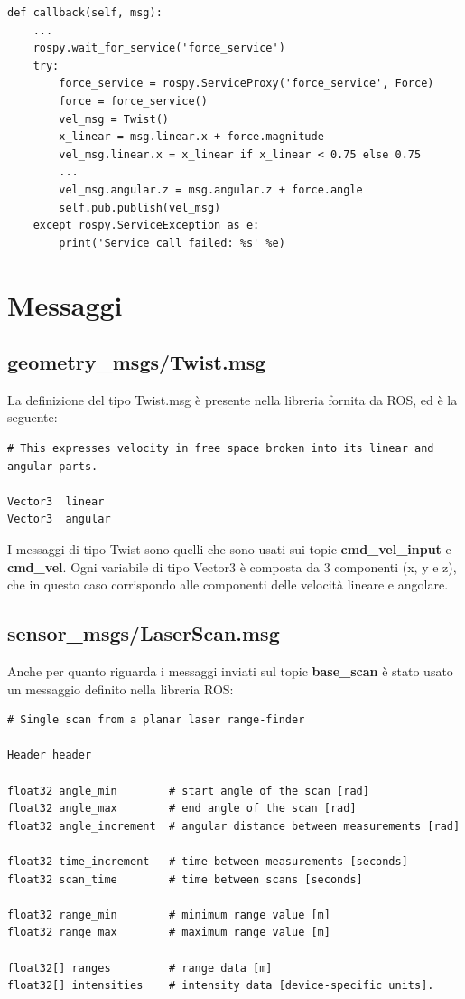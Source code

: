 \documentclass[Lau, binding=0.6cm, oneside]{sapthesis}
\begin{document}
\begin{lstlisting}
def callback(self, msg):
    ...
    rospy.wait_for_service('force_service')
    try:
        force_service = rospy.ServiceProxy('force_service', Force)
        force = force_service()
        vel_msg = Twist()
        x_linear = msg.linear.x + force.magnitude
        vel_msg.linear.x = x_linear if x_linear < 0.75 else 0.75
        ...
        vel_msg.angular.z = msg.angular.z + force.angle
        self.pub.publish(vel_msg)
    except rospy.ServiceException as e:
        print('Service call failed: %s' %e)
\end{lstlisting}

\section{Messaggi}
\subsection{geometry\_msgs/Twist.msg}
La definizione del tipo Twist.msg è presente nella libreria fornita da ROS, ed è la seguente\cite{fonte5}:
\begin{lstlisting}
# This expresses velocity in free space broken into its linear and angular parts.

Vector3  linear
Vector3  angular
\end{lstlisting}
I messaggi di tipo Twist sono quelli che sono usati sui topic \textbf{cmd\_vel\_input} e \textbf{cmd\_vel}.
Ogni variabile di tipo Vector3 è composta da 3 componenti (x, y e z), che in questo caso corrispondo alle componenti delle velocità lineare e angolare.

\subsection{sensor\_msgs/LaserScan.msg}
Anche per quanto riguarda i messaggi inviati sul topic \textbf{base\_scan} è stato usato un messaggio definito nella libreria ROS\cite{fonte6}:
\begin{lstlisting}
# Single scan from a planar laser range-finder

Header header

float32 angle_min        # start angle of the scan [rad]
float32 angle_max        # end angle of the scan [rad]
float32 angle_increment  # angular distance between measurements [rad]

float32 time_increment   # time between measurements [seconds]
float32 scan_time        # time between scans [seconds]

float32 range_min        # minimum range value [m]
float32 range_max        # maximum range value [m]

float32[] ranges         # range data [m]
float32[] intensities    # intensity data [device-specific units].
\end{lstlisting}
\end{document}
